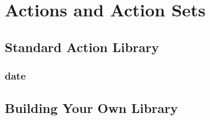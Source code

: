\chapter{Actions and Action Sets}



\section{Standard Action Library}

\subsection{date}
\printtabDateStd

\section{Building Your Own Library}

